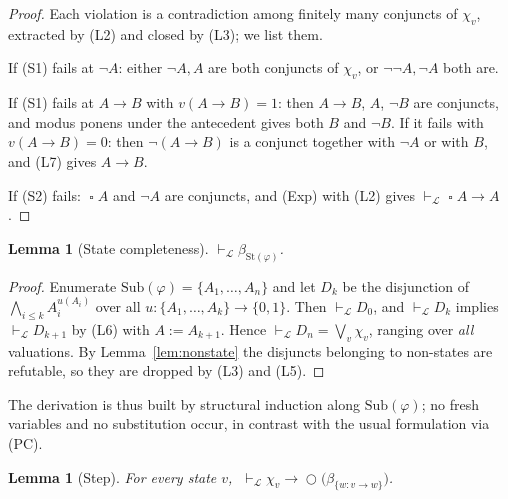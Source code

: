 \documentclass[11pt,a4paper]{article}
\newtheorem{lemma}[theorem]{Lemma}
\theoremstyle{definition}
\newcommand{\Next}{\mathop{\bigcirc}}
\newcommand{\Always}{\mathop{\square}}
\newcommand{\Sub}{\mathrm{Sub}}
\newcommand{\St}{\mathrm{St}}
\newcommand{\proves}{\vdash_{\mathcal{L}}}
\begin{document}
\begin{proof}
Each violation is a contradiction among finitely many conjuncts of $\chi_v$,
extracted by (L2) and closed by (L3); we list them.

If (S1) fails at $\neg A$: either $\neg A,A$ are both conjuncts of $\chi_v$, or
$\neg\neg A,\neg A$ both are.

If (S1) fails at $A\to B$ with $v(A\to B)=1$: then $A\to B$, $A$, $\neg B$ are
conjuncts, and modus ponens under the antecedent gives both $B$ and $\neg B$.
If it fails with $v(A\to B)=0$: then $\neg(A\to B)$ is a conjunct together with
$\neg A$ or with $B$, and (L7) gives $A\to B$.

If (S2) fails: $\Always A$ and $\neg A$ are conjuncts, and (Exp) with (L2) gives
$\proves\Always A\to A$.
\end{proof}

\begin{lemma}[State completeness]\label{lem:complete}
$\proves\beta_{\St(\varphi)}$.
\end{lemma}

\begin{proof}
Enumerate $\Sub(\varphi)=\{A_1,\dots,A_n\}$ and let $D_k$ be the disjunction of
$\bigwedge_{i\le k}A_i^{u(A_i)}$ over all $u:\{A_1,\dots,A_k\}\to\{0,1\}$.  Then
$\proves D_0$, and $\proves D_k$ implies $\proves D_{k+1}$ by (L6) with
$A:=A_{k+1}$.  Hence $\proves D_n=\bigvee_v\chi_v$, ranging over \emph{all}
valuations.  By Lemma~\ref{lem:nonstate} the disjuncts belonging to non-states
are refutable, so they are dropped by (L3) and (L5).
\end{proof}

The derivation is thus built by structural induction along $\Sub(\varphi)$; no
fresh variables and no substitution occur, in contrast with the usual
formulation via (PC).

\begin{lemma}[Step]\label{lem:step}
For every state $v$, $\;\proves\chi_v\to\Next\bigl(\beta_{\{w:v\to w\}}\bigr)$.
\end{lemma}
\end{document}

